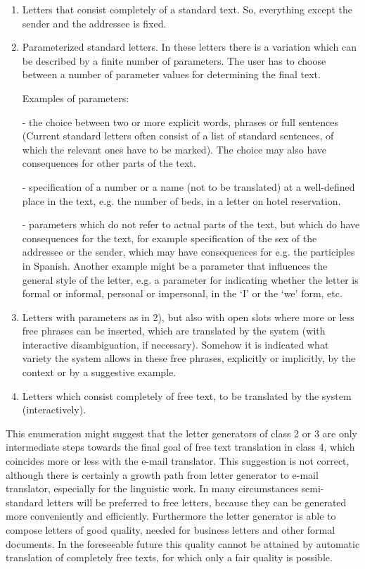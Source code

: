 \begin{enumerate}

\item Letters that consist completely of a standard text. So, everything 
except the sender and the addressee is fixed. 


\item Parameterized standard letters. In these letters there is a variation 
which can be described by a finite number of parameters. The user has to choose 
between a number of parameter values for determining the final text. 

Examples of parameters: 

- the choice between two or more explicit words, phrases or 
full sentences (Current standard letters 
often consist of a list of standard sentences, of which the relevant ones
have to be marked). The choice may also have consequences for other parts of 
the text.

- specification of a number or a name (not to be translated)
at a well-defined place in the text, e.g.
the number of beds, in a letter on hotel reservation.

- parameters which do not  refer to actual parts of the text, but which do have 
consequences for the text, for example 
specification of the sex of the addressee or the sender, which may have 
consequences for e.g. the participles in Spanish.
Another example might be a parameter that influences the general style of 
the letter, e.g.
a parameter for indicating whether the letter is formal or informal, personal 
or impersonal, in the `I' or the `we' form, etc.


\item Letters with parameters as in 2), but also with open 
slots where more or less 
free phrases 
can be inserted, which are translated by the system (with interactive 
disambiguation, if necessary). 
Somehow it is indicated what variety the system 
allows in these free phrases, explicitly or implicitly, by the
context or by a suggestive example. 


\item Letters which consist completely of free text, to be 
translated by the system (interactively).

\end{enumerate}

This enumeration might suggest that the letter generators of class 2 or 3 
are only intermediate steps towards the final goal of free text translation in 
class 4, which coincides more or less with the e-mail translator. 
This suggestion is not correct, although there is certainly a growth path 
from letter generator to 
e-mail translator, especially for the 
linguistic work. 
In many circumstances semi-standard letters 
will be preferred to free letters, 
because they can be generated more conveniently and efficiently. Furthermore the
letter generator is able to compose letters of good quality, needed for 
business letters and other formal documents. In the foreseeable future this 
quality cannot be attained by automatic translation of 
completely free texts, for which only a fair quality 
is possible. 

